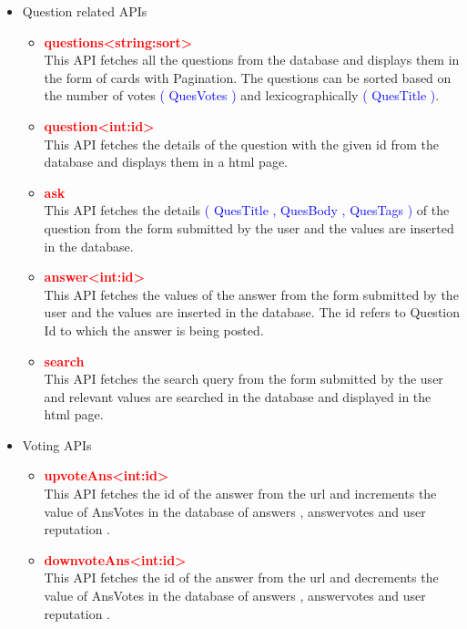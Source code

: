 \documentclass{article}
\begin{document}
\begin{itemize}
\begin{itemize}
    \end{itemize}
    \item Question related APIs
    \begin{itemize}
        \item \textcolor{red}{\textbf{\textfractionsolidus questions\textfractionsolidus \textless string:sort\textgreater }} \\ This API fetches all the questions from the database and displays them in the form of cards with Pagination. The questions can be sorted based on the number of votes \textcolor{blue}{( QuesVotes )} and lexicographically \textcolor{blue}{( QuesTitle )}.
        \item \textcolor{red}{\textbf{\textfractionsolidus question\textfractionsolidus \textless int:id\textgreater }} \\ This API fetches the details of the question with the given id from the database and displays them in a html page.
        \item \textcolor{red}{\textbf{\textfractionsolidus ask}} \\ This API fetches the details \textcolor{blue}{( QuesTitle , QuesBody , QuesTags )} of the question from the form submitted by the user and the values are inserted in the database.
        \item \textcolor{red}{\textbf{\textfractionsolidus answer\textfractionsolidus \textless int:id\textgreater }} \\ This API fetches the values of the answer from the form submitted by the user and the values are inserted in the database. The id refers to Question Id to which the answer is being posted.
        \item \textcolor{red}{\textbf{\textfractionsolidus search}} \\ This API fetches the search query from the form submitted by the user and relevant values are searched in the database and displayed in the html page.
    \end{itemize}
    \item Voting APIs
    \begin{itemize}
        \item \textcolor{red}{\textbf{\textfractionsolidus upvoteAns\textfractionsolidus \textless int:id\textgreater }} \\ This API fetches the id of the answer from the url and increments the value of AnsVotes in the database of answers , answervotes and user reputation .
        \item \textcolor{red}{\textbf{\textfractionsolidus downvoteAns\textfractionsolidus \textless int:id\textgreater }} \\ This API fetches the id of the answer from the url and decrements the value of AnsVotes in the database of answers , answervotes and user reputation .

\end{itemize}
\end{itemize}
\end{document}
